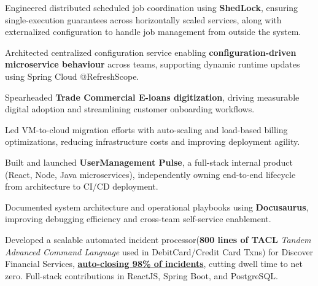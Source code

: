 \documentclass[]{hanisntsolo-resume}
\begin{document}
\begin{minipage}[t]{0.66\textwidth}
\begin{tightemize}
\item Engineered distributed scheduled job coordination using \textbf{ShedLock}, ensuring single-execution guarantees across horizontally scaled services, along with externalized configuration to handle job management from outside the system.

\item Architected centralized configuration service enabling \textbf{configuration-driven microservice behaviour} across teams, supporting dynamic runtime updates using Spring Cloud @RefreshScope.
\item Spearheaded \textbf{Trade Commercial E-loans digitization}, driving measurable digital adoption and streamlining customer onboarding workflows.

\item Led VM-to-cloud migration efforts with auto-scaling and load-based billing optimizations, reducing infrastructure costs and improving deployment agility.

\item Built and launched \textbf{UserManagement Pulse}, a full-stack internal product (React, Node, Java microservices), independently owning end-to-end lifecycle from architecture to CI/CD deployment.

\item Documented system architecture and operational playbooks using \textbf{Docusaurus}, improving debugging efficiency and cross-team self-service enablement.


\end{tightemize}

\begin{tightemize}
\item Developed a scalable automated incident processor(\textbf{800 lines of TACL} \textit{Tandem Advanced Command Language} used in DebitCard/Credit Card Txns) for  Discover Financial Services, \href{https://singhdhirendrafolio.blogspot.com/2022/05/pulse-ams-l15-success-story-in-d-life.html}{\small\faExternalLink* \textbf{ auto-closing 98\% of incidents}}, cutting dwell time to net zero.
Full-stack contributions in ReactJS, Spring Boot, and PostgreSQL.
\end{tightemize}


\end{minipage}
\end{document}

